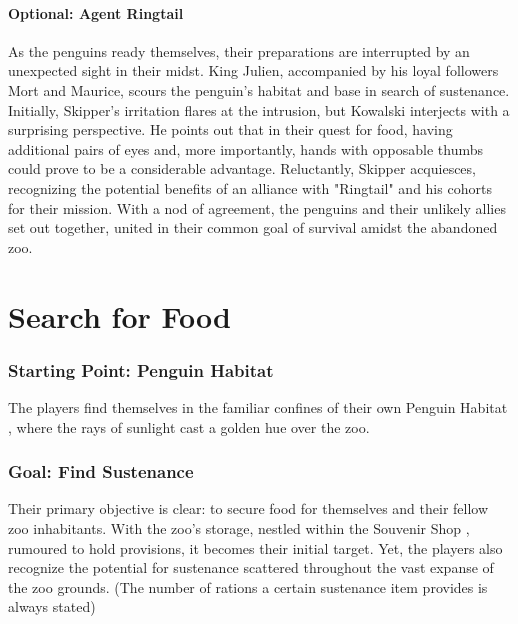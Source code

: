 \paragraph*{Optional: Agent Ringtail}
As the penguins ready themselves, their preparations are interrupted by an unexpected sight in their midst. King Julien, accompanied by his loyal followers Mort and Maurice, scours the penguin's habitat and base in search of sustenance. Initially, Skipper's irritation flares at the intrusion, but Kowalski interjects with a surprising perspective. He points out that in their quest for food, having additional pairs of eyes and, more importantly, hands with opposable thumbs could prove to be a considerable advantage. Reluctantly, Skipper acquiesces, recognizing the potential benefits of an alliance with "Ringtail" and his cohorts for their mission. With a nod of agreement, the penguins and their unlikely allies set out together, united in their common goal of survival amidst the abandoned zoo.

\section*{Search for Food}
\subsubsection*{Starting Point: Penguin Habitat}
The players find themselves in the familiar confines of their own Penguin Habitat , where the rays of sunlight cast a golden hue over the zoo.
\subsubsection*{Goal: Find Sustenance}
Their primary objective is clear: to secure food for themselves and their fellow zoo inhabitants. With the zoo's storage, nestled within the Souvenir Shop , rumoured to hold provisions, it becomes their initial target. Yet, the players also recognize the potential for sustenance scattered throughout the vast expanse of the zoo grounds. (The number of rations a certain sustenance item provides is always stated)
